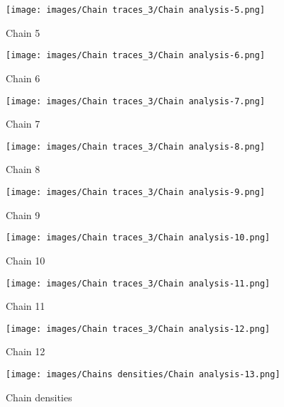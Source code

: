 \documentclass[12pt]{article}
\begin{document}
\begin{figure}[!htb]
   \begin{minipage}{0.48\textwidth}
     \centering
     \texttt{[image: images/Chain traces\_3/Chain analysis-5.png]}
     \caption{Chain 5}\label{Fig:Chain 5}
   \end{minipage}\hfill
   \begin{minipage}{0.48\textwidth}
     \centering
     \texttt{[image: images/Chain traces\_3/Chain analysis-6.png]}
     \caption{Chain 6}\label{Fig: Chain 6}
   \end{minipage}
\end{figure}

\begin{figure}[!htb]
   \begin{minipage}{0.48\textwidth}
     \centering
     \texttt{[image: images/Chain traces\_3/Chain analysis-7.png]}
     \caption{Chain 7}\label{Fig:Chain 7}
   \end{minipage}\hfill
   \begin{minipage}{0.48\textwidth}
     \centering
     \texttt{[image: images/Chain traces\_3/Chain analysis-8.png]}
     \caption{Chain 8}\label{Fig: Chain 8}
   \end{minipage}
\end{figure}

\begin{figure}[!htb]
   \begin{minipage}{0.48\textwidth}
     \centering
     \texttt{[image: images/Chain traces\_3/Chain analysis-9.png]}
     \caption{Chain 9}\label{Fig:Chain 9}
   \end{minipage}\hfill
   \begin{minipage}{0.48\textwidth}
     \centering
     \texttt{[image: images/Chain traces\_3/Chain analysis-10.png]}
     \caption{Chain 10}\label{Fig: Chain 10}
   \end{minipage}
\end{figure}

\begin{figure}[!htb]
   \begin{minipage}{0.48\textwidth}
     \centering
     \texttt{[image: images/Chain traces\_3/Chain analysis-11.png]}
     \caption{Chain 11}\label{Fig:Chain 11}
   \end{minipage}\hfill
   \begin{minipage}{0.48\textwidth}
     \centering
     \texttt{[image: images/Chain traces\_3/Chain analysis-12.png]}
     \caption{Chain 12}\label{Fig: Chain 12}
   \end{minipage}
\end{figure}


 \begin{figure}[h]
    \centering
    \texttt{[image: images/Chains densities/Chain analysis-13.png]}
    \caption{Chain densities}
    \label{fig:Model 3: Chain densities}
\end{figure}

\\
\end{document}
